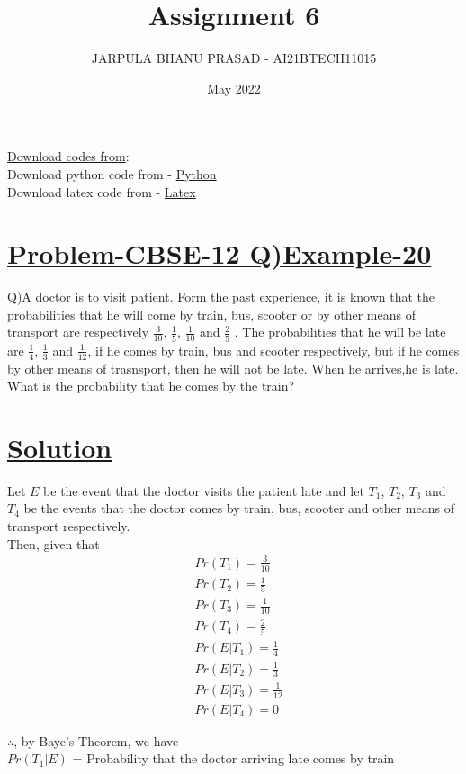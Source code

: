 \documentclass[journal,12pt,twocolumn]{IEEEtran}
\title{Assignment 6}
\author{JARPULA BHANU PRASAD - AI21BTECH11015}
\date{May 2022}
\begin{document}
\maketitle
\noindent \Large\underline{Download codes from}:\\
\noindent\large Download python code from - \href{https://github.com/jarpula-Bhanu/Assignment-6/blob/main/code/verify.py}{Python}\\ Download latex code from - \href{}{Latex}

\section{\large\underline{Problem-CBSE-12 Q)Example-20}}
\noindent\large Q)A doctor is to visit patient. Form the past experience, it is known that the probabilities that he will come by train, bus, scooter or by other means of transport are respectively $\frac{3}{10}$, $\frac{1}{5}$, $\frac{1}{10}$ and $\frac{2}{5}$ . The probabilities that he will be late are $\frac{1}{4}$, $\frac{1}{3}$ and $\frac{1}{12}$, if he comes by train, bus and scooter respectively, but if he comes by other means of trasnsport, then he will not be late. When he arrives,he is late. What is the probability that he comes by the train?

\section{\large\underline{Solution}}
\noindent Let $E$ be the event that the doctor visits the patient late and let $T_1$, $T_2$, $T_3$ and $T_4$ be the events that the doctor comes by train, bus, scooter and other means of transport respectively. \\
Then, given that
\begin{align}
& Pr(T_1) = \frac{3}{10} \\
& Pr(T_2) = \frac{1}{5} \\
& Pr(T_3) = \frac{1}{10} \\
& Pr(T_4) = \frac{2}{5} \\
& Pr(E|T_1) = \frac{1}{4} \\
& Pr(E|T_2) = \frac{1}{3} \\
& Pr(E|T_3) = \frac{1}{12} \\
& Pr(E|T_4) = 0 
\end{align}

$\therefore$, by Baye's Theorem, we have \\
$Pr(T_1|E)$ = Probability that the doctor arriving late comes by train 
\end{document}

